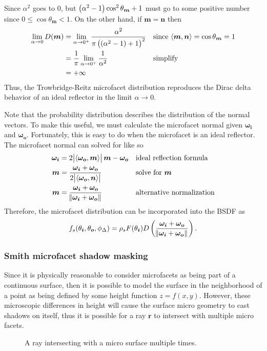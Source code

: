 \documentclass[12pt]{article}
\DeclarePairedDelimiter\ip{\langle }{\rangle}
\begin{document}
Since \(\alpha^2\) goes to \(0\), but \(\del{\alpha^2 - 1}\cos^2 \theta_{\bm m} + 1\) must go to some positive number since \(0 \leq \cos\theta_{\bm m} < 1\).
On the other hand, if \(\bm m = \bm n\) then
\begin{align*}
  \lim_{\alpha \to 0}D(\bm m)
  &= \lim_{\alpha \to 0^+}\frac{\alpha^2}{\pi\del{\del{\alpha^2 - 1} + 1}^2} && \text{since \(\ip{\bm m, \bm n} = \cos \theta_{\bm m} = 1\)}\\
  &= \frac{1}{\pi}\lim_{\alpha \to 0^+}\frac{1}{\alpha^2} && \text{simplify}\\
  &= +\infty
\end{align*}
Thus, the Trowbridge-Reitz microfacet distribution reproduces the Dirac delta behavior of an ideal reflector in the limit \(\alpha \to 0\).

Note that the probability distribution describes the distribution of the normal vectors.
To make this useful, we must calculate the microfacet normal given \(\bm{\omega_i}\) and \(\bm{\omega_o}\).
Fortunately, this is easy to do when the microfacet is an ideal reflector.
The microfacet normal can solved for like so
\begin{align*}
  \bm{\omega_i} &= 2\abs{\ip{\bm{\omega_o}, \bm m}}\bm m-  \bm{\omega_o} && \text{ideal reflection formula}\\
  \bm m &= \frac{\bm{\omega_i} + \bm{\omega_o}}{2\abs{\ip{\bm{\omega_o}, \bm n}}} && \text{solve for \(\bm m\)}\\
  \bm m &= \frac{\bm{\omega_i} + \bm{\omega_o}}{\norm{\bm{\omega_i} + \bm{\omega_o}}} && \text{alternative normalization}
\end{align*}
Therefore, the microfacet distribution can be incorporated into the BSDF as
\[f_s(\theta_{\bm i}, \theta_{\bm o}, \phi_\Delta) = \rho_sF(\theta_{\bm i})D\del{\frac{\bm{\omega_i} + \bm{\omega_o}}{\norm{\bm{\omega_i} + \bm{\omega_o}}}}.\]

\subsubsection{Smith microfacet shadow masking}

Since it is physically reasonable to consider microfacets as being part of a continuous surface, then it is possible to model the surface in the neighborhood of a point as being defined by some height function \(z = f(x, y)\).
However, these microscopic differences in height will cause the surface micro geometry to cast shadows on itself, thus it is possible for a ray \( \bm r\) to intersect with multiple micro facets.
\begin{figure}[H]
  \centering
  \caption{A ray intersecting with a micro surface multiple times.}
\end{figure}
\end{document}
